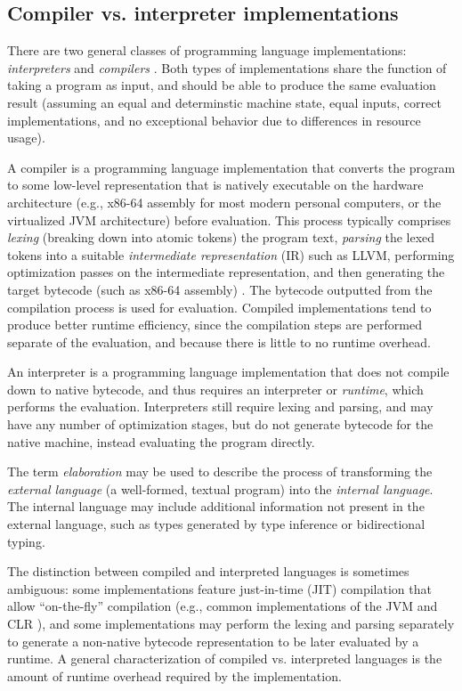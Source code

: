 \subsection{Compiler vs. interpreter implementations}
\label{sec:comp-vs-interp}

There are two general classes of programming language implementations: \textit{interpreters} and \textit{compilers} \cite{aho86}. Both types of implementations share the function of taking a program as input, and should be able to produce the same evaluation result (assuming an equal and determinstic machine state, equal inputs, correct implementations, and no exceptional behavior due to differences in resource usage).

A compiler is a programming language implementation that converts the program to some low-level representation that is natively executable on the hardware architecture (e.g., x86-64 assembly for most modern personal computers, or the virtualized JVM architecture) before evaluation. This process typically comprises \textit{lexing} (breaking down into atomic tokens) the program text, \textit{parsing} the lexed tokens into a suitable \textit{intermediate representation} (IR) such as LLVM, performing optimization passes on the intermediate representation, and then generating the target bytecode (such as x86-64 assembly) \cite{aho86}. The bytecode outputted from the compilation process is used for evaluation. Compiled implementations tend to produce better runtime efficiency, since the compilation steps are performed separate of the evaluation, and because there is little to no runtime overhead.

An interpreter is a programming language implementation that does not compile down to native bytecode, and thus requires an interpreter or \textit{runtime}, which performs the evaluation. Interpreters still require lexing and parsing, and may have any number of optimization stages, but do not generate bytecode for the native machine, instead evaluating the program directly.

The term \textit{elaboration} \cite{harper2000type} may be used to describe the process of transforming the \textit{external language} (a well-formed, textual program) into the \textit{internal language}. The internal language may include additional information not present in the external language, such as types generated by type inference or bidirectional typing.

The distinction between compiled and interpreted languages is sometimes ambiguous: some implementations feature just-in-time (JIT) compilation that allow ``on-the-fly'' compilation (e.g., common implementations of the JVM and CLR \cite{sestoft2002runtime}), and some implementations may perform the lexing and parsing separately to generate a non-native bytecode representation to be later evaluated by a runtime. A general characterization of compiled vs. interpreted languages is the amount of runtime overhead required by the implementation.

